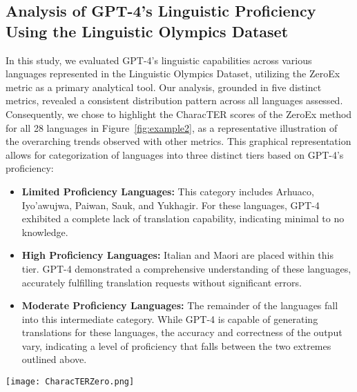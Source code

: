 \documentclass[10pt, a4paper]{article}
\begin{document}
\subsection{Analysis of GPT-4's Linguistic Proficiency Using the Linguistic Olympics Dataset}

In this study, we evaluated GPT-4's linguistic capabilities across various languages represented in the Linguistic Olympics Dataset, utilizing the ZeroEx metric as a primary analytical tool. Our analysis, grounded in five distinct metrics, revealed a consistent distribution pattern across all languages assessed. Consequently, we chose to highlight the CharacTER scores of the ZeroEx method for all 28 languages in Figure~\ref{fig:example2}, as a representative illustration of the overarching trends observed with other metrics. This graphical representation allows for categorization of languages into three distinct tiers based on GPT-4's proficiency:

\begin{itemize}
\item \textbf{Limited Proficiency Languages:} This category includes Arhuaco, Iyo'awujwa, Paiwan, Sauk, and Yukhagir. For these languages, GPT-4 exhibited a complete lack of translation capability, indicating minimal to no knowledge.
\item \textbf{High Proficiency Languages:} Italian and Maori are placed within this tier. GPT-4 demonstrated a comprehensive understanding of these languages, accurately fulfilling translation requests without significant errors.
\item \textbf{Moderate Proficiency Languages:} The remainder of the languages fall into this intermediate category. While GPT-4 is capable of generating translations for these languages, the accuracy and correctness of the output vary, indicating a level of proficiency that falls between the two extremes outlined above.
\end{itemize}

\begin{figure*}[h!]
    \centering
    \texttt{[image: CharacTERZero.png]}
    \caption{characTER score of zero example}
    \label{fig:example2}
\end{figure*}
\end{document}

